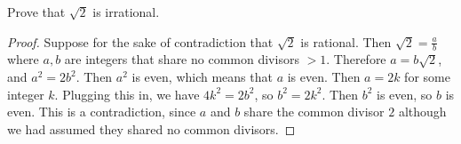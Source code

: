 \begin{example}
Prove that $\sqrt{2}$ is irrational.
\end{example}

\begin{proof}
Suppose for the sake of contradiction that $\sqrt 2$ is rational. Then $\sqrt 2 = \frac a b$ where $a, b$ are integers that share no common divisors $ > 1$. Therefore $a = b\sqrt 2$, and $a^2 = 2b^2$. Then $a^2$ is even, which means that $a$ is even. Then $a = 2k$ for some integer $k$. Plugging this in, we have $4k^2 = 2b^2$, so $b^2 = 2k^2$. Then $b^2$ is even, so $b$ is even. This is a contradiction, since $a$ and $b$ share the common divisor $2$ although we had assumed they shared no common divisors.
\end{proof}